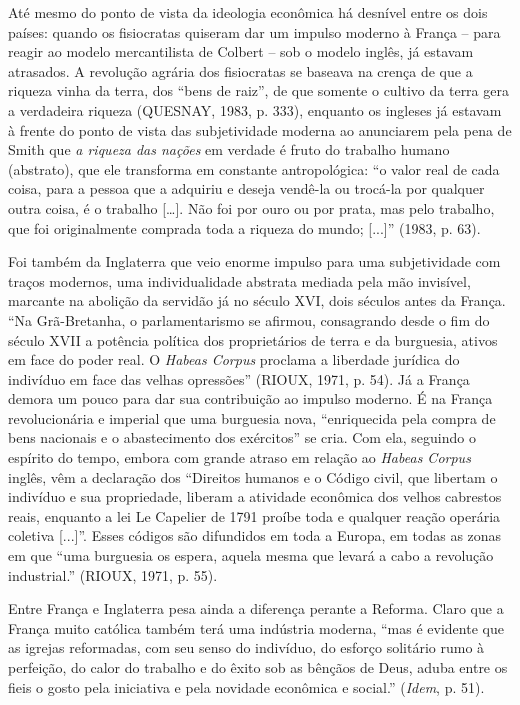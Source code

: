 Até mesmo do ponto de vista da ideologia econômica há desnível entre os
dois países: quando os fisiocratas quiseram dar um impulso moderno à
França -- para reagir ao modelo mercantilista de Colbert -- sob o modelo
inglês, já estavam atrasados. A revolução agrária dos fisiocratas se
baseava na crença de que a riqueza vinha da terra, dos ``bens de raiz'',
de que somente o cultivo da terra gera a verdadeira riqueza (QUESNAY,
1983, p. 333), enquanto os ingleses já estavam à frente do ponto de
vista das subjetividade moderna ao anunciarem pela pena de Smith que
\emph{a riqueza das nações} em verdade é fruto do trabalho humano
(abstrato), que ele transforma em constante antropológica: ``o valor
real de cada coisa, para a pessoa que a adquiriu e deseja vendê-la ou
trocá-la por qualquer outra coisa, é o trabalho {[}\ldots{}{]}. Não foi
por ouro ou por prata, mas pelo trabalho, que foi originalmente comprada
toda a riqueza do mundo; {[}...{]}'' (1983, p. 63).

Foi também da Inglaterra que veio enorme impulso para uma subjetividade
com traços modernos, uma individualidade abstrata mediada pela mão
invisível, marcante na abolição da servidão já no século XVI, dois
séculos antes da França. ``Na Grã-Bretanha, o parlamentarismo se
afirmou, consagrando desde o fim do século XVII a potência política dos
proprietários de terra e da burguesia, ativos em face do poder real. O
\emph{Habeas Corpus} proclama a liberdade jurídica do indivíduo em face
das velhas opressões'' (RIOUX, 1971, p. 54). Já a França demora um pouco
para dar sua contribuição ao impulso moderno. É na França revolucionária
e imperial que uma burguesia nova, ``enriquecida pela compra de bens
nacionais e o abastecimento dos exércitos'' se cria. Com ela, seguindo o
espírito do tempo, embora com grande atraso em relação ao \emph{Habeas
Corpus} inglês, vêm a declaração dos ``Direitos humanos e o Código
civil, que libertam o indivíduo e sua propriedade, liberam a atividade
econômica dos velhos cabrestos reais, enquanto a lei Le Capelier de 1791
proíbe toda e qualquer reação operária coletiva {[}...{]}''. Esses
códigos são difundidos em toda a Europa, em todas as zonas em que ``uma
burguesia os espera, aquela mesma que levará a cabo a revolução
industrial.'' (RIOUX, 1971, p. 55).

Entre França e Inglaterra pesa ainda a diferença perante a Reforma.
Claro que a França muito católica também terá uma indústria moderna,
``mas é evidente que as igrejas reformadas, com seu senso do indivíduo,
do esforço solitário rumo à perfeição, do calor do trabalho e do êxito
sob as bênçãos de Deus, aduba entre os fieis o gosto pela iniciativa e
pela novidade econômica e social.'' (\emph{Idem}, p. 51).

